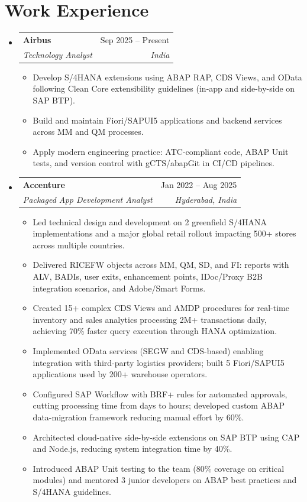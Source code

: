 \documentclass[letterpaper,11pt]{article}
\makeatletter
\newcommand{\resumeItem}[1]{
  \item\small{
    {#1 \vspace{-2pt}}
  }
}
\newcommand{\resumeSubheading}[4]{
  \vspace{-2pt}\item
    \begin{tabular*}{0.97\textwidth}[t]{l@{\extracolsep{\fill}}r}
      \textbf{#1} & #2 \\
      \textit{\small#3} & \textit{\small #4} \\
    \end{tabular*}\vspace{-7pt}
}
\newcommand{\resumeSubHeadingListStart}{\begin{itemize}[leftmargin=0.15in, label={}]}
\newcommand{\resumeSubHeadingListEnd}{\end{itemize}}
\newcommand{\resumeItemListStart}{\begin{itemize}}
\newcommand{\resumeItemListEnd}{\end{itemize}\vspace{-5pt}}
\makeatother
\begin{document}
\section{Work Experience}
  \resumeSubHeadingListStart

    \resumeSubheading
      {Airbus}{Sep 2025 -- Present}
      {Technology Analyst}{India}
      \resumeItemListStart
        \resumeItem{Develop S/4HANA extensions using ABAP RAP, CDS Views, and OData following Clean Core extensibility guidelines (in-app and side-by-side on SAP BTP).}
        \resumeItem{Build and maintain Fiori/SAPUI5 applications and backend services across MM and QM processes.}
        \resumeItem{Apply modern engineering practice: ATC-compliant code, ABAP Unit tests, and version control with gCTS/abapGit in CI/CD pipelines.}
      \resumeItemListEnd

    \resumeSubheading
      {Accenture}{Jan 2022 -- Aug 2025}
      {Packaged App Development Analyst}{Hyderabad, India}
      \resumeItemListStart
        \resumeItem{Led technical design and development on 2 greenfield S/4HANA implementations and a major global retail rollout impacting 500+ stores across multiple countries.}
        \resumeItem{Delivered RICEFW objects across MM, QM, SD, and FI: reports with ALV, BADIs, user exits, enhancement points, IDoc/Proxy B2B integration scenarios, and Adobe/Smart Forms.}
        \resumeItem{Created 15+ complex CDS Views and AMDP procedures for real-time inventory and sales analytics processing 2M+ transactions daily, achieving 70\% faster query execution through HANA optimization.}
        \resumeItem{Implemented OData services (SEGW and CDS-based) enabling integration with third-party logistics providers; built 5 Fiori/SAPUI5 applications used by 200+ warehouse operators.}
        \resumeItem{Configured SAP Workflow with BRF+ rules for automated approvals, cutting processing time from days to hours; developed custom ABAP data-migration framework reducing manual effort by 60\%.}
        \resumeItem{Architected cloud-native side-by-side extensions on SAP BTP using CAP and Node.js, reducing system integration time by 40\%.}
        \resumeItem{Introduced ABAP Unit testing to the team (80\% coverage on critical modules) and mentored 3 junior developers on ABAP best practices and S/4HANA guidelines.}

      \resumeItemListEnd

  \resumeSubHeadingListEnd

\end{document}
